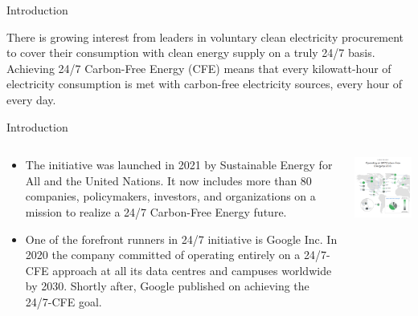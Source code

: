 \begin{frame}{Introduction}

  \centering

  There is growing interest from leaders in voluntary clean
  electricity procurement to cover their consumption 
  with clean energy supply on a \alert{truly 24/7 basis}. \\
  \vspace{0.3cm}
  Achieving 24/7 Carbon-Free Energy (CFE) means that every kilowatt-hour of electricity consumption is met
  with carbon-free electricity sources, \alert{every hour of every day}.
  
\end{frame}


\begin{frame}{Introduction}
  
  \begin{columns}[T]
  \begin{column}{8cm}

    \begin{itemize}
    \item The  
    initiative was launched in 2021 by Sustainable Energy for All and the United Nations. 
    It now includes more than 80 companies, policymakers, investors, and organizations 
    on a mission to realize a 24/7 Carbon-Free Energy future. 

    \item One of the forefront runners in 24/7 initiative is Google Inc. In 2020 the company committed 
    of operating entirely on a 24/7-CFE approach at all its data centres and campuses worldwide by 2030. 
    Shortly after, Google published 
    on achieving the 24/7-CFE goal.

    \end{itemize}
  \end{column}

  \begin{column}{8cm}
    \centering
    \includegraphics[width=7.5cm]{images/247-google-web.png}
    \vspace{.1cm}
  \end{column}


\end{columns}
\end{frame}

